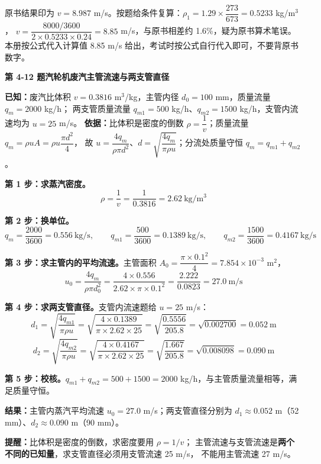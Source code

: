 \begin{tishi}
原书结果印为 $v=8.987$ m/s。按题给条件复算：$\rho_1=1.29\times\dfrac{273}{673}=0.5233$ kg/m$^3$，
$v=\dfrac{8000/3600}{2\times0.5233\times0.24}=8.85$ m/s，与原书相差约 1.6\%，疑为原书算术笔误。
本册按公式代入计算值 8.85 m/s 给出，考试时按公式自行代入即可，不要背原书数字。
\end{tishi}

\noindent\textbf{第 4-12 题\quad 汽轮机废汽主管流速与两支管直径}

\begin{jie}
\textbf{已知：}废汽比体积 $v=0.3816$ m$^3$/kg，主管内径 $d_0=100$ mm，质量流量 $q_m=2000$ kg/h；
两支管质量流量 $q_{m1}=500$ kg/h、$q_{m2}=1500$ kg/h，支管内流速均为 $u=25$ m/s。
\textbf{依据：}比体积是密度的倒数 $\rho=\dfrac{1}{v}$；质量流量 $q_m=\rho uA=\rho u\dfrac{\pi d^2}{4}$，
故 $u=\dfrac{4q_m}{\rho\pi d^2}$、$d=\sqrt{\dfrac{4q_m}{\pi\rho u}}$；分流处质量守恒 $q_m=q_{m1}+q_{m2}$。

\textbf{第 1 步：求蒸汽密度。}
\[ \rho=\frac{1}{v}=\frac{1}{0.3816}=2.62\ \mathrm{kg/m^3} \]

\textbf{第 2 步：换单位。}
\[ q_m=\frac{2000}{3600}=0.556\ \mathrm{kg/s},\qquad
   q_{m1}=\frac{500}{3600}=0.1389\ \mathrm{kg/s},\qquad
   q_{m2}=\frac{1500}{3600}=0.4167\ \mathrm{kg/s} \]

\textbf{第 3 步：求主管内的平均流速。}主管面积 $A_0=\dfrac{\pi\times0.1^2}{4}=7.854\times10^{-3}$ m$^2$，
\[ u_0=\frac{4q_m}{\rho\pi d_0^2}=\frac{4\times0.556}{2.62\times\pi\times0.1^2}=\frac{2.222}{0.0823}=27.0\ \mathrm{m/s} \]

\textbf{第 4 步：求两支管直径。}支管内流速题给 $u=25$ m/s：
\[ d_1=\sqrt{\frac{4q_{m1}}{\pi\rho u}}=\sqrt{\frac{4\times0.1389}{\pi\times2.62\times25}}
     =\sqrt{\frac{0.5556}{205.8}}=\sqrt{0.002700}=0.052\ \mathrm{m} \]
\[ d_2=\sqrt{\frac{4q_{m2}}{\pi\rho u}}=\sqrt{\frac{4\times0.4167}{\pi\times2.62\times25}}
     =\sqrt{\frac{1.667}{205.8}}=\sqrt{0.008098}=0.090\ \mathrm{m} \]

\textbf{第 5 步：校核。}$q_{m1}+q_{m2}=500+1500=2000$ kg/h，与主管质量流量相等，满足质量守恒。

\textbf{结果：}主管内蒸汽平均流速 $u_0=27.0$ m/s；两支管直径分别为
$d_1\approx0.052$ m（52 mm）、$d_2\approx0.090$ m（90 mm）。

\textbf{提醒：}比体积是密度的倒数，求密度要用 $\rho=1/v$；
主管流速与支管流速是\textbf{两个不同的已知量}，求支管直径必须用支管流速 25 m/s，
不能用主管流速 27 m/s。
\end{jie}

